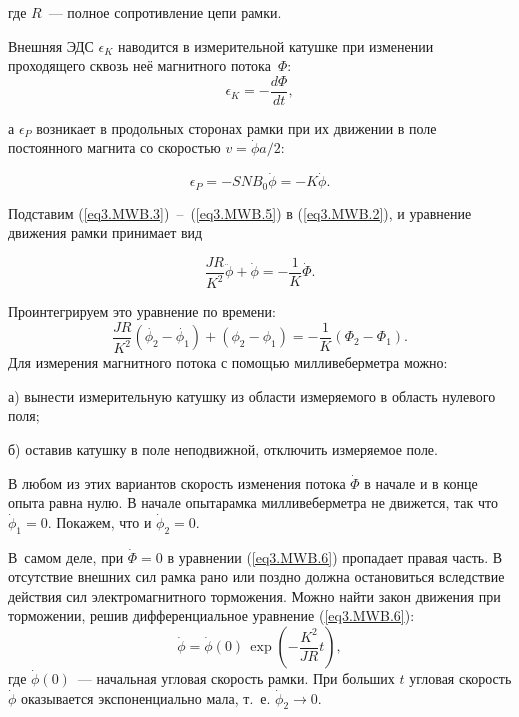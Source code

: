 где $R$~--- полное сопротивление цепи рамки.

Внешняя ЭДС $\epsilon_K$ наводится в измерительной катушке при изменении проходящего сквозь неё магнитного потока~$\Phi$:
\begin{equation}
\epsilon_K=-\frac{d\Phi}{dt},
\label{eq3.MWB.4}
\end{equation}

а $\epsilon_P$ возникает в продольных сторонах рамки при их движении в поле постоянного магнита со скоростью $v=\dot{\phi}a/2$:

\begin{equation}
\epsilon_P=-SNB_0\dot\phi=-K\dot\phi.
\label{eq3.MWB.5}
\end{equation}

Подставим (\ref{eq3.MWB.3})~--~(\ref{eq3.MWB.5}) в (\ref{eq3.MWB.2}), и уравнение движения рамки принимает вид

\begin{equation}
\frac{JR}{K^2}\ddot{\phi}+\dot{\phi}=-\frac{1}{K}\dot{\Phi}.
\label{eq3.MWB.6}
\end{equation}

Проинтегрируем это уравнение по времени:
\begin{equation}
\frac{JR}{K^2}(\dot{\phi_2}-\dot{\phi_1})+(\phi_2-\phi_1)=-\frac{1}{K}(\Phi_2-\Phi_1).
\label{eq3.MWB.7}
\end{equation}
Для измерения магнитного потока с помощью милливеберметра можно:

а) вынести измерительную катушку из области измеряемого в область нулевого поля;

б) оставив катушку в поле неподвижной, отключить измеряемое поле.

В любом  из этих вариантов скорость изменения потока $\dot{\Phi}$ в начале и в конце опыта равна нулю. В начале опытарамка милливеберметра не движется, так что $\dot{\phi}_1=0$. Покажем, что и $\dot{\phi}_2=0$.

В~самом деле, при $\dot{\Phi}=0$ в уравнении (\ref{eq3.MWB.6}) пропадает правая часть. В отсутствие внешних сил рамка рано или поздно должна остановиться вследствие действия сил электромагнитного торможения. Можно найти закон движения при торможении, решив дифференциальное уравнение (\ref{eq3.MWB.6}):
\begin{equation}
\dot{\phi}=\dot{\phi}(0)\,\exp\left(-\frac{K^2}{JR}t\right),
\label{eq3.MWB.8}
\end{equation}
где $\dot{\phi}(0)$~--- начальная угловая скорость рамки. При больших $t$ угловая скорость $\dot{\phi}$ оказывается экспоненциально мала, т.~е. $\dot{\phi}_2\rightarrow 0$.

